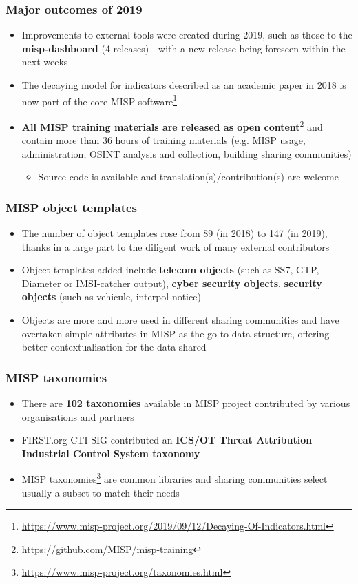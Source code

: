 \begin{frame}
        \frametitle{Major outcomes of 2019}
        \begin{itemize}
                \item Improvements to external tools were created during 2019, such as those to the {\bf misp-dashboard} (4 releases) - with a new release being foreseen within the next weeks
                \item The decaying model for indicators described as an academic paper in 2018 is now part of the core MISP software\footnote{\url{https://www.misp-project.org/2019/09/12/Decaying-Of-Indicators.html}}
                \item {\bf All MISP training materials are released as open content}\footnote{\url{https://github.com/MISP/misp-training}} and contain more than 36 hours of training materials (e.g. MISP usage, administration, OSINT analysis and collection,  building sharing communities)
                        \begin{itemize}
                                \item Source code is available and translation(s)/contribution(s) are welcome
                        \end{itemize}
        \end{itemize}
\end{frame}

\begin{frame}
        \frametitle{MISP object templates}
        \begin{itemize}
                \item The number of object templates rose from 89 (in 2018) to 147 (in 2019), thanks in a large part to the diligent work of many external contributors
                \item Object templates added include {\bf telecom objects} (such as SS7, GTP, Diameter or IMSI-catcher output), {\bf cyber security objects}, {\bf security objects} (such as vehicule, interpol-notice)
                \item Objects are more and more used in different sharing communities and have overtaken simple attributes in MISP as the go-to data structure, offering better contextualisation for the data shared
        \end{itemize}
\end{frame}

\begin{frame}
        \frametitle{MISP taxonomies}
        \begin{itemize}
                \item There are {\bf 102 taxonomies} available in MISP project contributed by various organisations and partners
                \item FIRST.org CTI SIG contributed an {\bf ICS/OT Threat Attribution Industrial Control System taxonomy}
                \item MISP taxonomies\footnote{\url{https://www.misp-project.org/taxonomies.html}} are common libraries and sharing communities select usually a subset to match their needs
        \end{itemize}
\end{frame}

